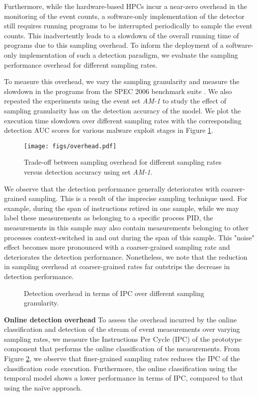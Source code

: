 \documentclass{acm_proc_article-sp}
\begin{document}
Furthermore, while the hardware-based HPCs incur a near-zero overhead in the monitoring of the event counts, a software-only implementation of the detector still requires running programs to be interrupted periodically to sample the event counts. This inadvertently leads to a slowdown of the overall running time of programs due to this sampling overhead. To inform the deployment of a software-only implementation of such a detection paradigm, we evaluate the sampling performance overhead for different sampling rates.

To measure this overhead, we vary the sampling granularity and measure the slowdown in the programs from the SPEC 2006 benchmark suite \cite{Henning:2006:SCB:1186736.1186737}. We also repeated the experiments using the event set \textit{AM-1} to study the effect of sampling granularity has on the detection accuracy of the model. We plot the execution time slowdown over different sampling rates with the corresponding detection AUC scores for various malware exploit stages in Figure \ref{fig:samp_overhead}. 

\begin{figure}
  \centering
  \texttt{[image: figs/overhead.pdf]}
  \caption{Trade-off between sampling overhead for different sampling rates versus detection accuracy using set \textit{AM-1}.}
  \label{fig:samp_overhead}
\end{figure}

We observe that the detection performance generally deteriorates with coarser-grained sampling. This is a result of the imprecise sampling technique used. For example, during the span of instructions retired in one sample, while we may label these measurements as belonging to a specific process PID, the measurements in this sample may also contain measurements belonging to other processes context-switched in and out during the span of this sample. This "noise" effect becomes more pronounced with a coarser-grained sampling rate and deteriorates the detection performance. Nonetheless, we note that the reduction in sampling overhead at coarser-grained rates far outstrips the decrease in detection performance.


\iffalse
	\begin{figure}
	  \centering
\caption{Detection overhead in terms of IPC over different sampling granularity.}
	  \label{fig:detection_overhead}
	\end{figure}
	
	\textbf{Online detection overhead} \space\space To assess the overhead incurred by the online classification and detection of the stream of event measurements over varying sampling rates, we measure the Instructions Per Cycle (IPC) of the prototype component that performs the online classification of the measurements. From Figure \ref{fig:detection_overhead}, we observe that finer-grained sampling rates reduces the IPC of the classification code execution. Furthermore, the online classification using the temporal model shows a lower performance in terms of IPC, compared to that using the na\"{i}ve approach.
	
\end{document}
